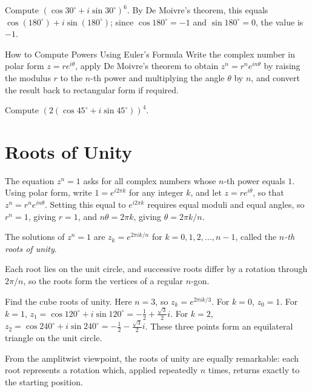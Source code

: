 \begin{example}
Compute $(\cos30^\circ+i\sin30^\circ)^6$. By De Moivre's theorem, this
equals $\cos(180^\circ)+i\sin(180^\circ)$; since $\cos180^\circ=-1$ and
$\sin180^\circ=0$, the value is $-1$.
\end{example}

\begin{algorithmproc}{How to Compute Powers Using Euler's Formula}
Write the complex number in polar form $z = re^{i\theta}$, apply De
Moivre's theorem to obtain $z^n = r^ne^{in\theta}$ by raising the modulus
$r$ to the $n$-th power and multiplying the angle $\theta$ by $n$, and
convert the result back to rectangular form if required.
\end{algorithmproc}

\begin{practicenow}
Compute $\left(2(\cos45^\circ+i\sin45^\circ)\right)^4$.
\end{practicenow}

\section{Roots of Unity}

The equation $z^n=1$ asks for all complex numbers whose $n$-th power
equals $1$. Using polar form, write $1 = e^{i2\pi k}$ for any integer
$k$, and let $z = re^{i\theta}$, so that $z^n = r^ne^{in\theta}$. Setting
this equal to $e^{i2\pi k}$ requires equal moduli and equal angles, so
$r^n=1$, giving $r=1$, and $n\theta = 2\pi k$, giving $\theta = 2\pi
k/n$.

\begin{theorem}
The solutions of $z^n=1$ are $z_k = e^{2\pi ik/n}$ for $k = 0, 1, 2,
\dots, n-1$, called the \emph{$n$-th roots of unity}.
\end{theorem}

Each root lies on the unit circle, and successive roots differ by a
rotation through $2\pi/n$, so the roots form the vertices of a regular
$n$-gon.

\begin{example}
Find the cube roots of unity. Here $n=3$, so $z_k = e^{2\pi ik/3}$. For
$k=0$, $z_0=1$. For $k=1$, $z_1 = \cos120^\circ+i\sin120^\circ =
-\tfrac12+\tfrac{\sqrt3}{2}i$. For $k=2$, $z_2 = \cos240^\circ +
i\sin240^\circ = -\tfrac12-\tfrac{\sqrt3}{2}i$. These three points form
an equilateral triangle on the unit circle.
\end{example}

From the amplitwist viewpoint, the roots of unity are equally
remarkable: each root represents a rotation which, applied repeatedly $n$
times, returns exactly to the starting position.

